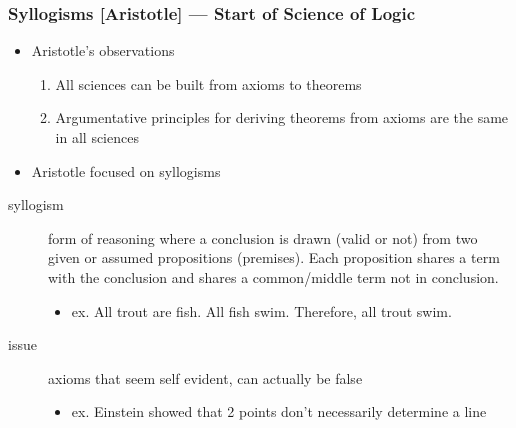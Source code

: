 \subsubsection{Syllogisms [Aristotle] --- Start of Science of Logic}
\begin{itemize}
	\item Aristotle's observations
	      \begin{enumerate}
		      \item All sciences can be built from axioms to theorems
		      \item Argumentative principles for deriving theorems from axioms
		            are the same in all sciences
	      \end{enumerate}
	\item Aristotle focused on syllogisms
\end{itemize}
\begin{description}
	\item[syllogism] form of reasoning where a conclusion is drawn (valid or
		not) from two given or assumed propositions (premises). Each proposition
		shares a term with the conclusion and shares a common/middle term not in
		conclusion.
		\begin{itemize}
			\item ex. All trout are fish. All fish swim. Therefore, all trout
			      swim.
		\end{itemize}
	\item[issue] axioms that seem self evident, can actually be false
		\begin{itemize}
			\item ex. Einstein showed that 2 points don't necessarily determine
			      a line
		\end{itemize}
\end{description}


